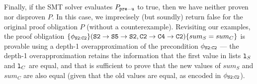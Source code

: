 Finally, if the SMT solver evaluates
$P_{{\tt pre-u}}$ to true, then we have neither
proven nor disproven $P$. In this case, we
imprecisely (but soundly) return false for the
original proof obligation $P$ (without a counterexample).
Revisiting our examples,
the proof obligation $\{\phi_{{\tt S2:C2}}\} ({\tt S2\rightarrow S5\rightarrow S2}, {\tt C2\rightarrow C4\rightarrow C2}) \\ \{sum_{S} = sum_{C}\}$ is provable using a depth-1 overapproximation of the
precondition $\phi_{{\tt S2:C2}}$ --- the depth-1 overapproximation retains the
information that the first value in lists ${\tt l}_S$
and ${\tt l}_C$ are equal, and that is sufficient to prove that
the new values of $sum_{S}$ and $sum_{C}$ are also equal (given that the
old values are equal, as encoded in $\phi_{{\tt S2:C2}}$).

